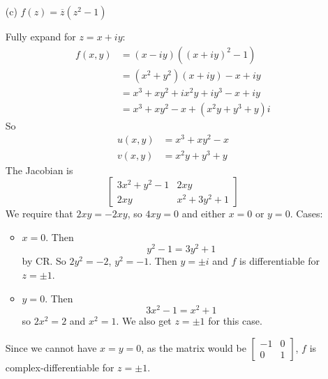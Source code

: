 \documentclass{article}
\begin{document}
\begin{itemize}
        \item [(c)] $f(z) = \overline{z}(z^{2} - 1)$
            \begin{answer}
                Fully expand for $z = x + iy$:
                    \begin{align*}
                        f(x, y) &= (x - iy)((x + iy)^{2} - 1)                 \\
                                &= (x^{2} + y^{2})(x + iy) - x + iy           \\
                                &= x^{3} + xy^{2} + ix^{2}y + iy^{3} - x + iy \\
                                &= x^{3} + xy^{2} - x + (x^{2}y + y^{3} + y)i   
                    \end{align*}
                So
                    \begin{align*}
                        u(x, y) &= x^{3} + xy^{2} - x \\
                        v(x, y) &= x^{2}y + y^{3} + y   
                    \end{align*}
                The Jacobian is
                    \begin{equation*}
                        \begin{bmatrix}
                            3x^{2} + y^{2} - 1 & 2xy                \\
                            2xy                & x^{2} + 3y^{2} + 1   
                        \end{bmatrix}
                    \end{equation*}
                We require that $2xy = -2xy$, so $4xy = 0$ and either $x = 0$ or $y = 0$. Cases:
                    \begin{itemize}
                        \item $x = 0$. Then 
                            \begin{equation*}
                                y^{2} - 1 = 3y^{2} + 1
                            \end{equation*}
                        by CR. So $2y^{2} = -2$, $y^{2} = -1$. Then $y = \pm i$ and $f$ is differentiable for $z = \pm 1$.

                        \item $y = 0$. Then 
                            \begin{equation*}
                                3x^{2} - 1 = x^{2} + 1
                            \end{equation*}
                        so $2x^{2} = 2$ and $x^{2} = 1$. We also get $z = \pm 1$ for this case.
                    \end{itemize}
                Since we cannot have $x = y = 0$, as the matrix would be $\begin{bmatrix}
                    -1 & 0 \\
                    0  & 1   
                \end{bmatrix}$, $f$ is complex-differentiable for $z = \pm 1$.
            \end{answer}


\end{itemize}
\end{document}
